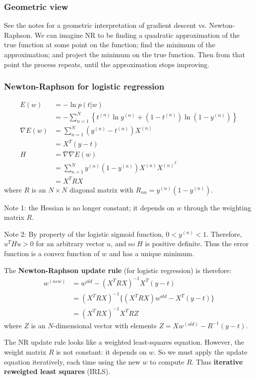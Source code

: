 \documentclass[a4paper,12pt]{article}
\begin{document}
\subsubsection{Geometric view}

See the notes for a geometric interpretation of gradient descent vs. Newton-Raphson. We can imagine NR to be finding a quadratic approximation of the true function at some point on the function; find the minimum of the approximation; and project the minimum on the true function. Then from that point the process repeats, until the approximation stops improving. 


\subsubsection{Newton-Raphson for logistic regression}

\begin{align*}
E(w) &= -\ln p(t|w) \\
	 &= -\sum_{n=1}^N \left\{ t^{(n)} \ln y^{(n)} + (1-t^{(n)})\ln(1-y^{(n)}) \right\} \\
\nabla E(w) &= \sum_{n=1}^N (y^{(n)}-t^{(n)})X^{(n)} \\
			&= X^T (y - t) \\
H &= \nabla \nabla E(w) \\
  &= \sum_{n=1}^N y^{(n)} (1-y^{(n)}) X^{(n)} X^{(n)^T}\\
  &= X^TRX
\end{align*}
where $R$ is an $N\times N$ diagonal matrix with $R_{nn} = y^{(n)}(1-y^{(n)})$. 

Note 1: the Hessian is no longer constant; it depends on $w$ through the weighting matrix $R$. 

Note 2: By property of the logistic sigmoid function, $0 < y^{(n)} < 1$. Therefore, $u^THu > 0$ for an arbitrary vector $u$, and so $H$ is positive definite. Thus the error function is a convex function of $w$ and has a unique minimum. 

The \textbf{Newton-Raphson update rule} (for logistic regression) is therefore: 
\begin{align*}
w^{(new)}&= w^{old} - (X^TRX)^{-1}X^T(y-t)\\
		 &= (X^TRX)^{-1} \{(X^TRX)w^{old} - X^T(y-t)\} \\
		 &= (X^T R X)^{-1} X^T R Z
\end{align*}
where $Z$ is an $N$-dimensional vector with elements $Z = X w^{(old)} - R^{-1}(y-t)$. 

The NR update rule looks like a weighted least-squares equation. However, the weight matrix $R$ is not constant: it depends on $w$. So we must apply the update equation iteratively, each time using the new $w$  to compute $R$. Thus \textbf{iterative reweigted least squares} (IRLS). 
\end{document}
